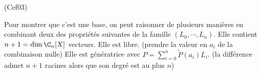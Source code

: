 \begin{tiny}(Cef03)\end{tiny} Pour montrer que c'est une base, on peut raisonner de plusieurs manières en combinant deux des propriétés suivantes de la famille $(L_0, \cdots, L_n)$.\newline
Elle contient $n+1 = \dim \C_n[X]$ vecteurs.\newline
Elle est libre. (prendre la valeur en $a_i$ de la combinaison nulle)\newline
Elle est génératrice avec $P = \sum_{i=0}^n \widetilde{P}(a_i)L_i$. (la différence admet $n+1$ racines alors que son degré est au plus $n$)
